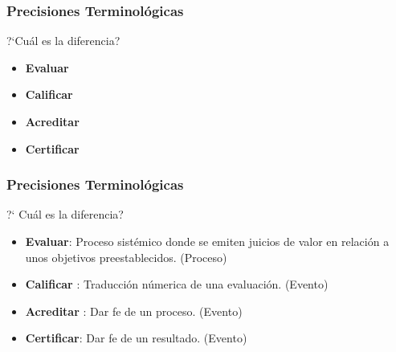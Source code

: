 \documentclass{beamer}
\begin{document}
\begin{frame}

\frametitle{Precisiones Terminol\'ogicas}
\begin{block}
{?`Cu\'al es la diferencia?}
\begin{itemize}
\item \textbf{Evaluar}
\item \textbf{Calificar} 
\item \textbf{Acreditar} 
\item \textbf{Certificar}
\end{itemize}
\end{block}
\end{frame}

\begin{frame}
\frametitle{Precisiones Terminol\'ogicas}
\begin{block}{?` Cu\'al es la diferencia? }
\begin{itemize}
\item \textbf{Evaluar}: Proceso sist\'emico donde se emiten juicios de valor en relaci\'on a unos objetivos preestablecidos. (Proceso)
\item \textbf{Calificar} : Traducci\'on n\'umerica de una evaluaci\'on. (Evento)
\item \textbf{Acreditar} : Dar fe de un proceso. (Evento)
\item \textbf{Certificar}: Dar fe de un resultado. (Evento)
\end{itemize}
\end{block}
\end{frame}
\end{document}
